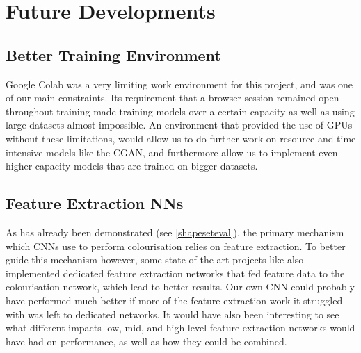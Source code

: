 \documentclass{l4proj}
\begin{document}
\section{Future Developments}
\subsection{Better Training Environment}

Google Colab was a very limiting work environment for this project, and was one of our main constraints. Its requirement that a browser session remained open throughout training made training models over a certain capacity as well as using large datasets almost impossible. An environment that provided the use of GPUs without these limitations, would allow us to do further work on resource and time intensive models like the CGAN, and furthermore allow us to implement even higher capacity models that are trained on bigger datasets.

\subsection{Feature Extraction NNs}

As has already been demonstrated (see \ref{shapeseteval}), the primary mechanism which CNNs use to perform colourisation relies on feature extraction. To better guide this mechanism however, some state of the art projects like \cite{DeepColorization} also implemented dedicated feature extraction networks that fed feature data to the colourisation network, which lead to better results. Our own CNN could probably have performed much better if more of the feature extraction work it struggled with was left to dedicated networks. It would have also been interesting to see what different impacts low, mid, and high level feature extraction networks would have had on performance, as well as how they could be combined.


\end{document}
